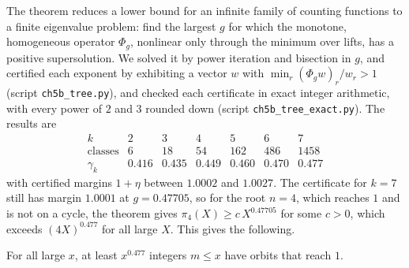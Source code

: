 The theorem reduces a lower bound for an infinite family of counting
functions to a finite eigenvalue problem: find the largest $g$ for which the
monotone, homogeneous operator $\Phi_g$, nonlinear only through the minimum over lifts, has a positive supersolution. We solved
it by power iteration and bisection in $g$, and certified each exponent by
exhibiting a vector $w$ with $\min_r(\Phi_g w)_r/w_r>1$ (script
\texttt{ch5b\_tree.py}), and checked each certificate in exact integer arithmetic, with every power of $2$ and $3$ rounded down (script \texttt{ch5b\_tree\_exact.py}). The results are
\[
\begin{array}{c|cccccc}
k & 2 & 3 & 4 & 5 & 6 & 7\\\hline
\text{classes} & 6 & 18 & 54 & 162 & 486 & 1458\\
\gamma_k & 0.416 & 0.435 & 0.449 & 0.460 & 0.470 & 0.477
\end{array}
\]
with certified margins $1+\eta$ between $1.0002$ and $1.0027$.
The certificate for $k=7$ still has margin $1.0001$ at $g=0.47705$, so for the root $n=4$, which reaches $1$ and is not on a cycle, the theorem gives $\pi_4(X)\ge c\,X^{0.47705}$ for some $c>0$, which exceeds $(4X)^{0.477}$ for all large $X$. This gives the following.

\begin{corollary}\label{cor:ch5b:count}
For all large $x$, at least $x^{0.477}$ integers $m\le x$ have orbits that
reach $1$.
\end{corollary}

